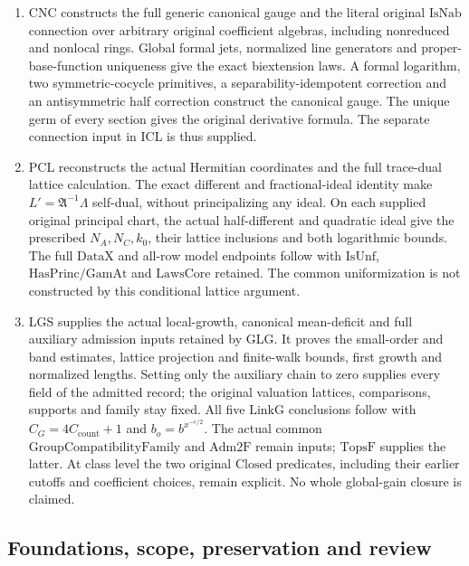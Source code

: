 \begin{enumerate}
\item CNC constructs the full generic canonical gauge and the literal
original \(\mathrm{IsNab}\) connection over arbitrary original
coefficient algebras, including nonreduced and nonlocal rings.
Global formal jets, normalized line generators and proper-base-function
uniqueness give the exact biextension laws. A formal logarithm,
two symmetric-cocycle primitives, a separability-idempotent correction
and an antisymmetric half correction construct the canonical gauge.
The unique germ of every section gives the original derivative formula.
The separate connection input in ICL is thus supplied.

\item PCL reconstructs the actual Hermitian coordinates and the full
trace-dual lattice calculation. The exact different and fractional-ideal
identity make \(L'=\mathfrak A^{-1}\Lambda\) self-dual, without
principalizing any ideal. On each supplied original principal chart,
the actual half-different and quadratic ideal give the prescribed
\(N_A,N_C,k_0\), their lattice inclusions and both logarithmic bounds.
The full \(\mathrm{DataX}\) and all-row model endpoints follow with
\(\mathrm{IsUnf}\), \(\mathrm{HasPrinc}/\mathrm{GamAt}\) and
\(\mathrm{LawsCore}\) retained. The common uniformization is not
constructed by this conditional lattice argument.

\item LGS supplies the actual local-growth, canonical mean-deficit
and full auxiliary admission inputs retained by GLG. It proves the
small-order and band estimates, lattice projection and finite-walk
bounds, first growth and normalized lengths. Setting only the
auxiliary chain to zero supplies every field of the admitted record;
the original valuation lattices, comparisons, supports and family
stay fixed. All five \(\mathrm{LinkG}\) conclusions follow with
\(C_G=4C_{\mathrm{count}}+1\) and
\(b_o=b^{x^{-\epsilon/2}}\).
The actual common \(\mathrm{GroupCompatibilityFamily}\) and
\(\mathrm{Adm2F}\) remain inputs; \(\mathrm{TopsF}\) supplies
the latter. At class level the two original \(\mathrm{Closed}\)
predicates, including their earlier cutoffs and coefficient choices,
remain explicit. No whole global-gain closure is claimed.
\end{enumerate}

\subsection{Foundations, scope, preservation and review}

